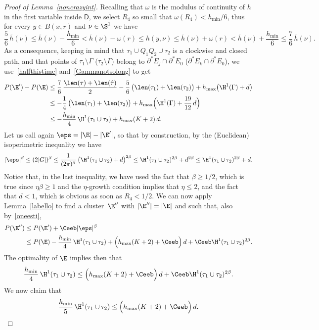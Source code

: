 \begin{proof}[Proof of Lemma~\ref{noncrazyint}]
Recalling that $\omega$ is the modulus of continuity of $h$ in the first variable inside $\mathsf{D}$, we select $R_4$ so small that $\omega(R_4)< h_{\min}/6$, thus for every $y\in B(x,r)$ and $\nu\in\S^1$ we have
\[
\frac 56\, \overline h(\nu) \leq \overline h(\nu)- \frac{h_{\min}}6<\overline h(\nu)- \omega(r) \leq h(y,\nu) \leq \overline h(\nu) + \omega(r)< \overline h(\nu) + \frac{h_{\min}}6 \leq \frac 76\,\overline h(\nu).
\]
As a consequence, keeping in mind that $\tau_1\cup Q_1Q_2\cup\tau_2$ is a clockwise and closed path, and that points of $\tau_1\setminus \Gamma$ (\resp $\tau_2\setminus\Gamma$) belong to $\partial^* E_j\cap\partial^* E_0$ (\resp $\partial^* E_k\cap \partial^* E_0$), we use~\eqref{halfthistime} and~\eqref{Gammanotsolong} to get
\begin{align}
P(\E')-P(\E)&\leq \frac 76\,\frac{\len(\tau)+\len(\hat\tau)}2 - \frac 56\, \big(\len(\tau_1) +\len(\tau_2)\big)+ h_{\max} \big(\H^1(\Gamma)+d\big)\notag\\
&\leq -\frac 14\, \big(\len(\tau_1) +\len(\tau_2)\big)+ h_{\max} \Bigl(\H^1(\Gamma)+\frac{19}{12}\,d\Bigr)\label{oneesti}\\
& \leq -\frac {h_{\min}}4\, \H^1(\tau_1\cup\tau_2) + h_{\max} (K+2)\,d.\notag
\end{align}
Let us call again $\eps=|\E|-|\E'|$, so that by construction, by the (Euclidean) isoperimetric inequality we have
\[
|\eps|^\beta \leq (2 |G|)^\beta \leq \frac 1{(2\pi)^\beta} \, \big(\H^1(\tau_1 \cup\tau_2)+d\big)^{2\beta}\leq
\H^1(\tau_1 \cup\tau_2)^{2\beta}+d^{2\beta}
\leq \H^1(\tau_1 \cup\tau_2)^{2\beta}+d.
\]
Notice that, in the last inequality, we have used the fact that $\beta\geq 1/2$, which is true since $\eta\beta\geq 1$ and the $\eta$-growth condition implies that $\eta\leq 2$, and the fact that $d<1$, which is obvious as soon as $R_4<1/2$. We can now apply Lemma~\ref{labello} to find a cluster~$\E''$ with $|\E''|=|\E|$ and such that, also by~\eqref{oneesti},
\[\begin{split}
P(\E'') &\leq P(\E') + \Ceeb |\eps|^\beta\\
&\leq P(\E) -\frac{h_{\min}}4\,\H^1(\tau_1 \cup\tau_2)+ \Big(h_{\max} (K+2)+ \Ceeb\Big)\,d + \Ceeb \H^1(\tau_1 \cup\tau_2)^{2\beta}.
\end{split}\]
The optimality of $\E$ implies then that
\[
\frac{h_{\min}}4\,\H^1(\tau_1 \cup\tau_2)\leq \Big(h_{\max} (K+2)+ \Ceeb\Big)\,d + \Ceeb \H^1(\tau_1 \cup\tau_2)^{2\beta}.
\]
We now claim that
\begin{equation}\label{sinceopt}
\frac{h_{\min}}5\,\H^1(\tau_1 \cup\tau_2)\leq \Big(h_{\max} (K+2)+ \Ceeb\Big)\,d.

\end{equation}
\end{proof}
